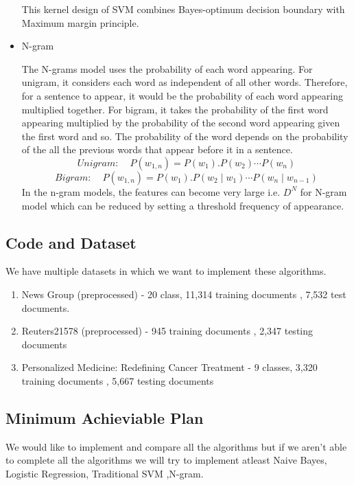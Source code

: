 \documentclass[a4paper, 11pt]{article}
\begin{document}
\begin{itemize}
		This kernel design of SVM combines Bayes-optimum decision boundary with Maximum margin principle. \cite{ding2014sensing}
		\item N-gram
		\par The N-grams model uses the probability of each word appearing. For unigram, it considers each word as independent of all other words. Therefore, for a sentence to appear, it would be the probability of each word appearing multiplied together. For bigram, it takes the probability of the first word appearing multiplied by the probability of the second word appearing given the first word and so. The probability of the word depends on the probability of the all the previous words that appear before it in a sentence. \cite{song1999general} \\
		\begin{equation}
		\textit{Unigram:}  \hspace{15pt} P(w_{1,n})  = P(w_1).P(w_2) \cdots P(w_n)
		\end{equation}
		\begin{equation}
		\textit{Bigram:}  \hspace{15pt} P(w_{1,n})  = P(w_1).P(w_2 \mid  w_1) \cdots P(w_n \mid w_{n-1})
		\end{equation}
		In the n-gram models, the features can become very large i.e. $D^N$ for N-gram model which can be reduced by setting a threshold frequency of appearance\cite{furnkranz1998study}.  \\
		

		
	\end{itemize}
	
	\subsection{Code and Dataset}
	We have multiple datasets in which we want to implement these algorithms. 
	\begin{enumerate}
		\item News Group (preprocessed) - 20 class, 11,314 training documents ,  7,532 test documents.
		\item Reuters21578 (preprocessed) - 945 training documents ,  2,347 testing documents \cite{dataset}
		\item Personalized Medicine: Redefining Cancer Treatment - 9 classes,  3,320 training documents , 5,667 testing documents  \cite{kaggledataset}
	\end{enumerate}
		
	\subsection{Minimum Achieviable Plan}
	We would like to implement and compare all the algorithms but if we aren't able to complete all the algorithms we will try to implement atleast Naive Bayes, Logistic Regression, Traditional SVM ,N-gram.
	
\end{document}
